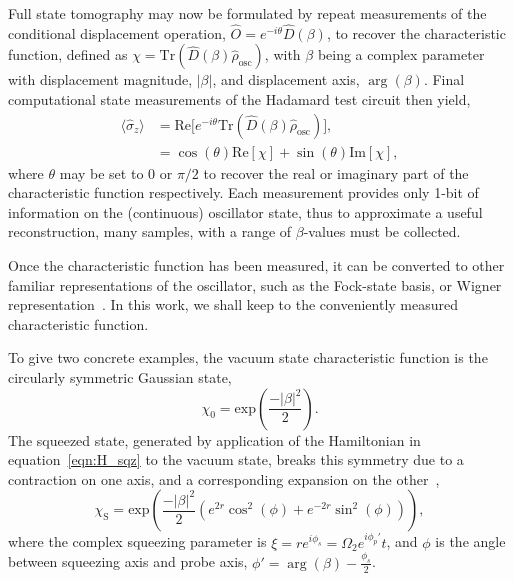     Full state tomography may now be formulated by repeat measurements of the conditional displacement operation, 
    $\hat O = e^{-i\theta}\hat D(\beta)$, to recover the characteristic function, defined as $\chi =
    \mathrm{Tr}(\hat D(\beta)\hat\rho_\mathrm{osc})$, with $\beta$ being a complex parameter with displacement magnitude, $|\beta|$, and displacement axis, $\arg(\beta)$.
    Final computational state measurements of the Hadamard test circuit then yield,
\begin{subequations}
    \begin{align}
    \langle \hat\sigma_z \rangle &= \mathrm{Re}\big[e^{-i\theta}\mathrm{Tr}(\hat D(\beta)\hat\rho_\mathrm{osc})\big],\\
                             &= \cos(\theta)\mathrm{Re}[\chi] + \sin(\theta)\mathrm{Im}[\chi],
    \end{align}
\end{subequations}
    where $\theta$ may be set to $0$ or $\pi/2$ to recover the real or imaginary part of the characteristic function respectively.
    Each measurement provides only 1-bit of information on the (continuous) oscillator state, thus to approximate a useful reconstruction, 
    many samples, with a range of $\beta$-values must be collected.

    Once the characteristic function has been measured, it can be converted to other familiar representations of the oscillator, such as the Fock-state basis, or Wigner representation~\cite{wigner_quantum_1932, cahill_density_1969, vogel_determination_1989}. In this work, we shall keep to the conveniently measured characteristic function.

    To give two concrete examples, the vacuum state characteristic function is the circularly symmetric Gaussian state,
    \begin{equation}
        \chi_\mathrm{0} = \mathrm{exp}\left(\frac{-|\beta|^2}{2}\right).
    \end{equation}
    The squeezed state, generated by application of the Hamiltonian in equation~\ref{eqn:H_sqz} to the vacuum state, breaks this symmetry due to a contraction on one axis, and a corresponding expansion on the other~\cite{lo_spinmotion_2015},
    \begin{equation}
        \label{eqn:sqz_char}
        \chi_\mathrm{S} = \mathrm{exp}\left(\frac{-|\beta|^2}{2}\left(e^{2r}\cos^2(\phi)+e^{-2r}\sin^2(\phi)
        \right)\right),
    \end{equation}
    where the complex squeezing parameter is $\xi = re^{i\phi_s} = \Omega_2e^{i\phi_p'}t$, and 
    $\phi$ is the angle between squeezing axis and probe axis, $\phi'=\arg(\beta)-\frac{\phi_s}{2}$.

